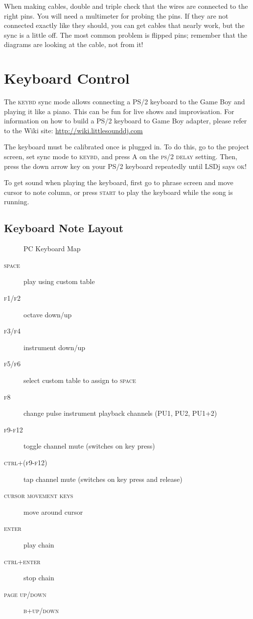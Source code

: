When making cables, double and triple check that the wires are connected to the right pins. You will need a multimeter for probing the pins. If they are not connected exactly like they should, you can get cables that nearly work, but the sync is a little off. The most common problem is flipped pins; remember that the diagrams are looking at the cable, not from it!

\section{Keyboard Control}

The \textsc{keybd} sync mode allows connecting a PS/2 keyboard to the Game Boy and playing it like a piano. This can be fun for live shows and improvisation. For information on how to build a PS/2 keyboard to Game Boy adapter, please refer to the Wiki site: \url{http://wiki.littlesounddj.com}

The keyboard must be calibrated once is plugged in. To do this, go to the project screen, set sync mode to \textsc{keybd}, and press \textsc{A} on the \textsc{ps/2 delay} setting. Then, press the down arrow key on your PS/2 keyboard repeatedly until LSDj says \textsc{ok!}

To get sound when playing the keyboard, first go to phrase screen and move cursor to note column, or press \textsc{start} to play the keyboard while the song is running.

\subsection{Keyboard Note Layout}

\begin{figure}[htpb]
	\begin{center}
	\end{center}
	\caption{PC Keyboard Map}
	\label{fig:keybd-map}
\end{figure}

\begin{description}
\item[\textsc{space}] play using custom table
\item[\textsc{f1/f2}] octave down/up
\item[\textsc{f3/f4}] instrument down/up
\item[\textsc{f5/f6}] select custom table to assign to \textsc{space}
\item[\textsc{f8}] change pulse instrument playback channels (\textsc{PU1, PU2, PU1+2})
\item[\textsc{f9-f12}] toggle channel mute (switches on key press)
\item[\textsc{ctrl+(f9-f12)}] tap channel mute (switches on key press and release)
\item[\textsc{cursor movement keys}] move around cursor
\item[\textsc{enter}] play chain
\item[\textsc{ctrl+enter}] stop chain
\item[\textsc{page up/down}] \textsc{b+up/down}
\end{description}

